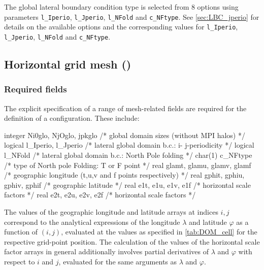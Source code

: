 \documentclass[../main/NEMO_manual]{subfiles}
\begin{document}
The global lateral boundary condition type is selected from 8 options using parameters \texttt{l\_Iperio}, \texttt{l\_Jperio}, \texttt{l\_NFold} and \texttt{c\_NFtype}.
See \autoref{sec:LBC_jperio} for details on the available options and
the corresponding values for \texttt{l\_Iperio}, \texttt{l\_Jperio}, \texttt{l\_NFold} and \texttt{c\_NFtype}.

\subsection[Horizontal grid mesh (\textit{domhgr.F90}]{Horizontal grid mesh (\protect{})}
\label{subsec:DOM_hgr}

\subsubsection{Required fields}
\label{sec:DOM_hgr_fields}

The explicit specification of a range of mesh-related fields are required for
the definition of a configuration.
These include:

\begin{clines}
integer   Ni0glo, NjOglo, jpkglo       /* global domain sizes (without MPI halos)                */
logical   l\_Iperio, l\_Jperio         /* lateral global domain b.c.: i- j-periodicity           */
logical   l\_NFold                     /* lateral global domain b.c.: North Pole folding         */
char(1)   c\_NFtype                    /*    type of North pole Folding: T or F point            */
real      glamt, glamu, glamv, glamf   /* geographic longitude (t,u,v and f points respectively) */
real      gphit, gphiu, gphiv, gphif   /* geographic latitude                                    */
real      e1t, e1u, e1v, e1f           /* horizontal scale factors                               */
real      e2t, e2u, e2v, e2f           /* horizontal scale factors                               */
\end{clines}

The values of the geographic longitude and latitude arrays at indices $i,j$ correspond to
the analytical expressions of the longitude $\lambda$ and latitude $\varphi$ as a function of $(i,j)$,
evaluated at the values as specified in \autoref{tab:DOM_cell} for the respective grid-point position.
The calculation of the values of the horizontal scale factor arrays in general additionally involves
partial derivatives of $\lambda$ and $\varphi$ with respect to $i$ and $j$,
evaluated for the same arguments as $\lambda$ and $\varphi$.
\end{document}
